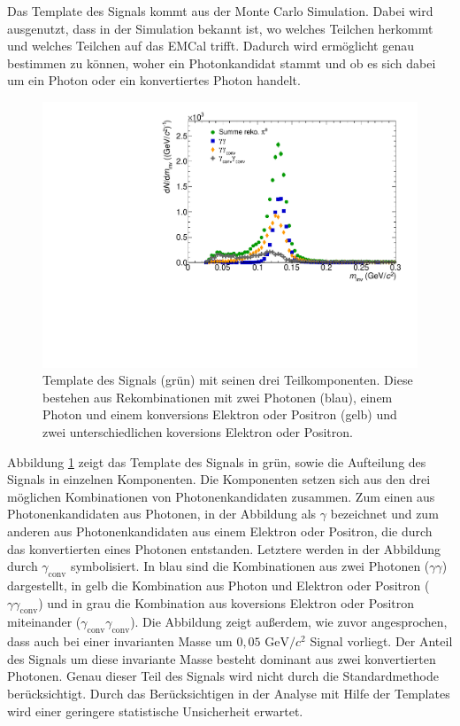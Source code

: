 Das Template des Signals kommt aus der Monte Carlo Simulation.
Dabei wird ausgenutzt, dass in der Simulation bekannt ist, wo welches Teilchen herkommt und welches Teilchen auf das EMCal trifft.
Dadurch wird erm\"oglicht genau bestimmen zu k\"onnen, woher ein Photonkandidat stammt und ob es sich dabei um ein Photon oder ein konvertiertes Photon handelt.
\begin{figure}[tp]
\centering
\includegraphics[width=.75\linewidth]{PeakTemplateMotivation10_Data_2016.pdf}
\caption{Template des Signals (gr\"un) mit seinen drei Teilkomponenten.
Diese bestehen aus Rekombinationen mit zwei Photonen (blau), einem Photon und einem konversions Elektron oder Positron (gelb) und zwei unterschiedlichen koversions Elektron oder Positron.}
\label{fig:SigTemp}
\end{figure}
\newline
Abbildung \ref{fig:SigTemp} zeigt das Template des Signals in gr\"un, sowie die Aufteilung des Signals in einzelnen Komponenten.
Die Komponenten setzen sich aus den drei m\"oglichen Kombinationen von Photonenkandidaten zusammen.
Zum einen aus Photonenkandidaten aus Photonen, in der Abbildung als $\gamma$ bezeichnet und zum anderen aus Photonenkandidaten aus einem Elektron oder Positron, die durch das konvertierten  eines Photonen entstanden.
Letztere werden in der Abbildung durch $\gamma_\text{conv}$ symbolisiert.
\newline
In blau sind die Kombinationen aus zwei Photonen ($\gamma\gamma$) dargestellt, in gelb die Kombination aus Photon und Elektron oder Positron ($\gamma\gamma_\text{conv}$) und in grau die Kombination aus koversions Elektron oder Positron miteinander ($\gamma_\text{conv}\gamma_\text{conv}$).
\newline
Die Abbildung zeigt au{\ss}erdem, wie zuvor angesprochen, dass auch bei einer invarianten Masse um $0,05 \text{ GeV}/c^{2}$ Signal vorliegt.
Der Anteil des Signals um diese invariante Masse besteht dominant aus zwei konvertierten Photonen.
Genau dieser Teil des Signals wird nicht durch die Standardmethode ber\"ucksichtigt.
Durch das Ber\"ucksichtigen in der Analyse mit Hilfe der Templates wird einer geringere statistische Unsicherheit erwartet.